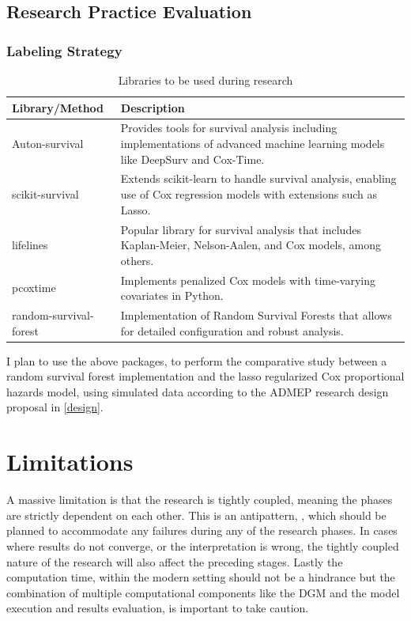 \subsection{Research Practice Evaluation}
\subsubsection*{Labeling Strategy}
\begin{table}[h]
\begin{tabularx}{\textwidth}{|X|X|}
\hline
Library/Method & Description \\
\hline
Auton-survival \parencite{nagpal_auton-survival_2022} & Provides tools for survival analysis including implementations of advanced machine learning models like DeepSurv and Cox-Time. \\
\hline
scikit-survival \parencite{sebastian_polsterl_scikit-survival_2023} & Extends scikit-learn \parencite{scikit-learn} to handle survival analysis, enabling use of Cox regression models with extensions such as Lasso. \\
\hline
lifelines \parencite{davidson-pilon_lifelines_2024} & Popular library for survival analysis that includes Kaplan-Meier, Nelson-Aalen, and Cox models, among others. \\
\hline
pcoxtime \parencite{cygu_pcoxtime_2021} & Implements penalized Cox models with time-varying covariates in Python. \\
\hline
random-survival-forest \parencite{spath_julianspaethrandom-survival-forest_2021} & Implementation of Random Survival Forests that allows for detailed configuration and robust analysis. \\
\hline
\end{tabularx}
\caption{Libraries to be used during research}
\label{tab:libs}
\end{table}

\noindent I plan to use the above packages, to perform the comparative study between a random survival forest implementation and the lasso regularized Cox proportional hazards model, using simulated data according to the ADMEP research design proposal in \ref{design}.

\section{Limitations} \label{methlim}
A massive limitation is that the research is tightly coupled, meaning the phases are strictly dependent on each other. This is an antipattern, \parencite{joshi_beginning_2016}, which should be planned to accommodate any failures during any of the research phases. In cases where results do not converge, or the interpretation is wrong, the tightly coupled nature of the research will also affect the preceding stages. Lastly the computation time, within the modern setting should not be a hindrance but the combination of multiple computational components like the DGM and the model execution and results evaluation, is important to take caution. 

